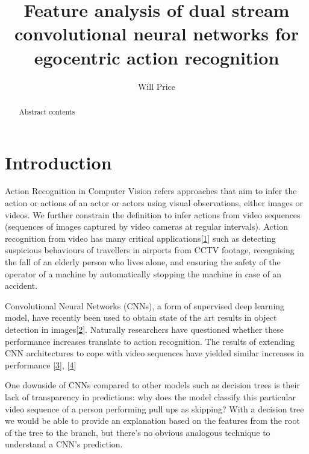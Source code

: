 \documentclass[A4paper,draft]{scrreprt}
\title{Feature analysis of dual stream convolutional neural networks for
egocentric action recognition}
\author{Will Price}
\institute{University of Bristol}
\date{}
\begin{document}
\maketitle
\begin{abstract}
Abstract contents
\end{abstract}

{
\hypersetup{linkcolor=black}
\setcounter{tocdepth}{2}
\tableofcontents
}
 

\chapter{Introduction}\label{sec:introduction}

Action Recognition in Computer Vision refers approaches that aim to
infer the action or actions of an actor or actors using visual
observations, either images or videos. We further constrain the
definition to infer actions from video sequences (sequences of images
captured by video cameras at regular intervals). Action recognition from
video has many critical
applications{[}\protect\hyperlink{ref-ranasinghe2016_reviewapplicationsactivity}{1}{]}
such as detecting suspicious behaviours of travellers in airports from
CCTV footage, recognising the fall of an elderly person who lives alone,
and ensuring the safety of the operator of a machine by automatically
stopping the machine in case of an accident.

Convolutional Neural Networks (CNNs), a form of supervised deep learning
model, have recently been used to obtain state of the art results in
object detection in
images{[}\protect\hyperlink{ref-krizhevsky2012_Imagenetclassificationdeep}{2}{]}.
Naturally researchers have questioned whether these performance
increases translate to action recognition. The results of extending CNN
architectures to cope with video sequences have yielded similar
increases in performance
{[}\protect\hyperlink{ref-feichtenhofer2016_ConvolutionalTwoStreamNetwork}{3}{]},
{[}\protect\hyperlink{ref-wang2016_TemporalSegmentNetworks}{4}{]}

One downside of CNNs compared to other models such as decision trees is
their lack of transparency in predictions: why does the model classify
this particular video sequence of a person performing pull ups as
skipping? With a decision tree we would be able to provide an
explanation based on the features from the root of the tree to the
branch, but there's no obvious analogous technique to understand a CNN's
prediction.
\end{document}
